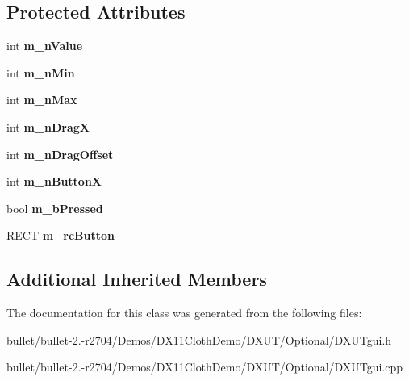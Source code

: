 \subsection*{Protected Attributes}
\begin{DoxyCompactItemize}
\item 
\hypertarget{class_c_d_x_u_t_slider_a2a6bf8157dfbd5edd87dcb192843fba6}{int {\bfseries m\+\_\+n\+Value}}\label{class_c_d_x_u_t_slider_a2a6bf8157dfbd5edd87dcb192843fba6}

\item 
\hypertarget{class_c_d_x_u_t_slider_a87ffaf1be6e79d1a653b9a975d46e789}{int {\bfseries m\+\_\+n\+Min}}\label{class_c_d_x_u_t_slider_a87ffaf1be6e79d1a653b9a975d46e789}

\item 
\hypertarget{class_c_d_x_u_t_slider_a9d298ae750ce680598ec967af330e20e}{int {\bfseries m\+\_\+n\+Max}}\label{class_c_d_x_u_t_slider_a9d298ae750ce680598ec967af330e20e}

\item 
\hypertarget{class_c_d_x_u_t_slider_a302ac014d55da16123986f808cc1ce9b}{int {\bfseries m\+\_\+n\+Drag\+X}}\label{class_c_d_x_u_t_slider_a302ac014d55da16123986f808cc1ce9b}

\item 
\hypertarget{class_c_d_x_u_t_slider_ae051d327e77fc42a5be5d21576d81993}{int {\bfseries m\+\_\+n\+Drag\+Offset}}\label{class_c_d_x_u_t_slider_ae051d327e77fc42a5be5d21576d81993}

\item 
\hypertarget{class_c_d_x_u_t_slider_aa6b6822fb10e3294c1880113e486416b}{int {\bfseries m\+\_\+n\+Button\+X}}\label{class_c_d_x_u_t_slider_aa6b6822fb10e3294c1880113e486416b}

\item 
\hypertarget{class_c_d_x_u_t_slider_a6060a106657615230e6b2cc51f7279ec}{bool {\bfseries m\+\_\+b\+Pressed}}\label{class_c_d_x_u_t_slider_a6060a106657615230e6b2cc51f7279ec}

\item 
\hypertarget{class_c_d_x_u_t_slider_a0b2ef9570791f34e0c0ba99eeda6adba}{R\+E\+C\+T {\bfseries m\+\_\+rc\+Button}}\label{class_c_d_x_u_t_slider_a0b2ef9570791f34e0c0ba99eeda6adba}

\end{DoxyCompactItemize}
\subsection*{Additional Inherited Members}


The documentation for this class was generated from the following files\+:\begin{DoxyCompactItemize}
\item 
bullet/bullet-\/2.-\/r2704/\+Demos/\+D\+X11\+Cloth\+Demo/\+D\+X\+U\+T/\+Optional/D\+X\+U\+Tgui.\+h\item 
bullet/bullet-\/2.-\/r2704/\+Demos/\+D\+X11\+Cloth\+Demo/\+D\+X\+U\+T/\+Optional/D\+X\+U\+Tgui.\+cpp\end{DoxyCompactItemize}
